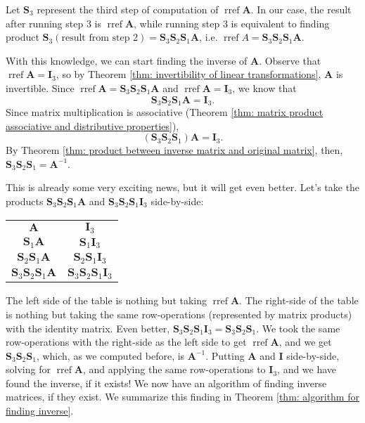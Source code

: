 \documentclass[]{book}
\DeclareMathOperator{\rref}{rref}
\newcommand{\inv}[1]{\ensuremath{{#1}^{-1}}}
\newcommand{\invm}[1]{\ensuremath{\inv{\mat{#1}}}}
\newcommand{\mat}[1]{\ensuremath{\mathbf{#1}}}
\newcommand{\idmat}[1][n]{\ensuremath{\mat{I}_#1}}
\begin{document}
Let $\mat{S}_3$ represent the third step of computation of $\rref\mat{A}$. In our case, the result after running step 3 is $\rref \mat{A}$, while running step 3 is equivalent to finding product $\mat{S}_3 (\text{result from step 2}) = \mat{S}_3\mat{S}_2\mat{S}_1\mat{A}$, i.e. $\rref{A} = \mat{S}_3\mat{S}_2\mat{S}_1\mat{A}$. 

With this knowledge, we can start finding the inverse of $\mat{A}$. Observe that $\rref\mat{A} = \idmat[3]$, so by Theorem \ref{thm: invertibility of linear transformations}, $\mat{A}$ is invertible. Since $\rref \mat{A} = \mat{S}_3\mat{S}_2\mat{S}_1\mat{A}$ and $\rref\mat{A} = \idmat[3]$, we know that
\[\mat{S}_3\mat{S}_2\mat{S}_1\mat{A} = \idmat[3].\]
Since matrix multiplication is associative (Theorem \ref{thm: matrix product associative and distributive properties}),
\[(\mat{S}_3\mat{S}_2\mat{S}_1)\mat{A} = \idmat[3].\]
By Theorem \ref{thm: product between inverse matrix and original matrix}, then, $\mat{S}_3\mat{S}_2\mat{S}_1 = \invm{A}$.

This is already some very exciting news, but it will get even better. Let's take the products $\mat{S}_3\mat{S}_2\mat{S}_1\mat{A}$ and $\mat{S}_3\mat{S}_2\mat{S}_1\idmat[3]$ side-by-side:
\begin{center}
    \begin{tabular}{c|c}
    $\mat{A}$ & $\idmat[3]$ \\
    $\mat{S}_1\mat{A}$ & $\mat{S}_1\idmat[3]$ \\
    $\mat{S}_2\mat{S}_1\mat{A}$ & $\mat{S}_2\mat{S}_1\idmat[3]$ \\
    $\mat{S}_3\mat{S}_2\mat{S}_1\mat{A}$ & $\mat{S}_3\mat{S}_2\mat{S}_1\idmat[3]$
\end{tabular}
\end{center}

The left side of the table is nothing but taking $\rref\mat{A}$. The right-side of the table is nothing but taking the same row-operations (represented by matrix products) with the identity matrix. Even better, $\mat{S}_3\mat{S}_2\mat{S}_1\idmat[3] = \mat{S}_3\mat{S}_2\mat{S}_1$. We took the same row-operations with the right-side as the left side to get $\rref\mat{A}$, and we get $\mat{S}_3\mat{S}_2\mat{S}_1$, which, as we computed before, is $\invm{A}$. Putting $\mat{A}$ and $\mat{I}$ side-by-side, solving for $\rref\mat{A}$, and applying the same row-operations to $\idmat[3]$, and we have found the inverse, if it exists!
We now have an algorithm of finding inverse matrices, if they exist. We summarize this finding in Theorem \ref{thm: algorithm for finding inverse}.
\end{document}
